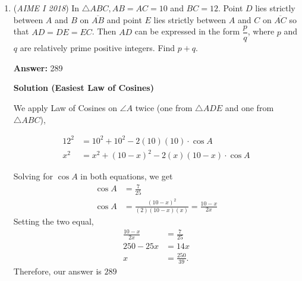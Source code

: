 \begin{enumerate}
 The total number of orderings is $\binom{10}{5} = 252,$ so the answer is $\frac{62}{252} = \boxed{\frac{31}{126}}$




\textbf{Solution 6 (Official MAA)}

Assume without loss of generality that the first card laid out is red. Then the arrangements that satisfy Kathy’s requirements are RRRRR, RRRRG, RRRGG, RRGGG, and RGGGG. The probability that Kathy will lay out one of thesearrangements is 
 \[\frac49\cdot\frac38\cdot\frac27\cdot\frac16\] 
 \[\frac49\cdot\frac38\cdot\frac27\cdot\frac56\] 
 \[\frac49\cdot\frac38\cdot\frac57\cdot\frac46\] 
 \[\frac49\cdot\frac58\cdot\frac47\cdot\frac36\] 
 \[+\frac59\cdot\frac48\cdot\frac37\cdot\frac26\] 
 \[\overline{..........................}\] 
 \[\frac{31}{126}\] The requested sum is $31+126=\boxed{157}.$



	\item (\textit{AIME I 2018}) In $\triangle ABC, AB = AC = 10$ and $BC = 12$. Point $D$ lies strictly between $A$ and $B$ on $\overline{AB}$ and point $E$ lies strictly between $A$ and $C$ on $\overline{AC}$ so that $AD = DE = EC$. Then $AD$ can be expressed in the form $\dfrac{p}{q}$, where $p$ and $q$ are relatively prime positive integers. Find $p+q$.


 
 \textbf{Answer: }289



\textbf{Solution (Easiest Law of Cosines)}

We apply Law of Cosines on $\angle A$ twice (one from $\triangle ADE$ and one from $\triangle ABC$),

 \begin{align*}12^2 &= 10^2 + 10^2 - 2(10)(10) \cdot \cos{A} \\[5pt]x^2&=x^2+(10-x)^2-2(x)(10-x)\cdot \cos{A} \end{align*}


 Solving for $\cos{A}$ in both equations, we get\begin{align*}\cos{A} &= \frac{7}{25} \\\cos{A} &= \frac{(10-x)^2}{(2)(10-x)(x)} = \frac{10-x}{2x}\end{align*}
Setting the two equal,\begin{align*} \frac{10-x}{2x} &= \frac{7}{25} \\[5pt]250-25x &= 14x \\[5pt]x &= \frac{250}{39}.\end{align*}
Therefore, our answer is $\boxed{289}$


\end{enumerate}
